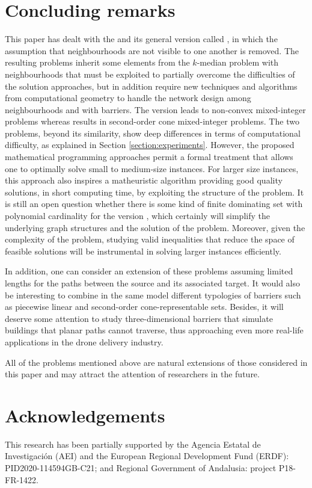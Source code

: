 \documentclass[a4paper,  review, authoryear, 1p.]{elsarticle}
\newcommand{\KMPHN}{{\sf{H-KMPHN}}}
\newcommand{\KMPN}{{\sf{H-KMPN}\xspace }}
\newcommand{\JP}[1]{{\color{armygreen}#1}}
\begin{document}
		
		\section{Concluding remarks}\label{section:conclusion}
		This paper has dealt with the \KMPHN \xspace and its general version called \KMPN, in which the assumption that neighbourhoods are not visible to one another is removed. \JP{The resulting problems inherit some elements from the $k$-median problem with neighbourhoods that must be exploited to partially overcome the difficulties of the solution approaches, but in addition require new techniques and algorithms  from computational geometry to handle the network design among neighbourhoods and with barriers. The \KMPN \xspace version leads to  non-convex mixed-integer problems whereas \KMPHN \xspace results in second-order cone mixed-integer problems.} The two problems, beyond its similarity, show deep differences in terms of computational difficulty, as explained in Section \ref{section:experiments}. However, the proposed mathematical programming approaches permit a formal treatment that allows one to optimally solve small to medium-size instances. For larger size instances, this approach also inspires a matheuristic algorithm providing good quality solutions, in short computing time, by exploiting the structure of the problem. It is still an open question whether there is some kind of finite dominating set with polynomial cardinality for the version \KMPHN, which certainly will simplify the underlying graph structures and the solution of the problem. Moreover, given the complexity of the problem, studying valid inequalities that reduce the space of feasible solutions will be instrumental in solving larger instances efficiently. 
		
		In addition, one can consider an extension of these problems assuming limited lengths for the paths between the source and its associated target. It would also be interesting to combine in the same model different typologies of barriers such as piecewise linear and second-order cone-representable sets. Besides, it will deserve some attention to study three-dimensional barriers that simulate buildings that planar paths cannot traverse, thus approaching even more real-life applications in the drone delivery industry. 
		
		All of the problems mentioned above are natural extensions of those considered in this paper and may attract the attention of researchers in the future.
		
		\section*{Acknowledgements}
		This research has been partially supported by the Agencia Estatal de Investigación (AEI) and the European Regional Development Fund (ERDF): PID2020-114594GB-C21; and Regional Government of Andalusia: project P18-FR-1422.
		
		
		
		
		
		
		
	
		
		
		
		
		
		
		
		
		
		
		
		
		
		
		
		
		

	
\end{document}
